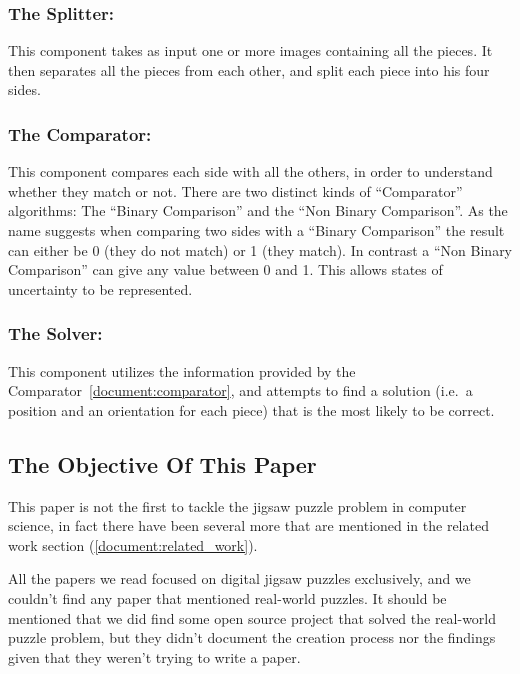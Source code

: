 \documentclass{article}
\newenvironment{indented_section}
  {\adjustwidth{3em}{0pt}}
  {\endadjustwidth}
\begin{document}
\begin{indented_section}

    \subsubsection{The Splitter:} This component takes as input one or more images
    containing all the pieces. It then separates all the pieces from each other,
    and split each piece into his four sides.\label{document:splitter}

    \subsubsection{The Comparator:} This component compares each side with all the
    others, in order to understand whether they match or not.\newline
    There are two distinct kinds of “Comparator” algorithms:
    The “Binary Comparison” and the “Non Binary Comparison”.
    As the name suggests when comparing two sides with a “Binary Comparison”
    the result can either be 0 (they do not match) or 1 (they match).
    In contrast a “Non Binary Comparison” can give any value between 0 and 1.
    This allows states of uncertainty to be represented.\label{document:comparator}

    \subsubsection{The Solver:} This component utilizes the information provided by the
    Comparator~\cref{document:comparator}, and attempts to find a solution
    (i.e.\ a position and an orientation for each piece)
    that is the most likely to be correct.\label{document:solver}

\end{indented_section}


\subsection{The Objective Of This Paper}\label{document:objective}

This paper is not the first to tackle the jigsaw puzzle problem in computer science,
in fact there have been several more that are mentioned in the related work section (\cref{document:related_work}).

All the papers we read focused on digital jigsaw puzzles exclusively,
and we couldn't find any paper that mentioned real-world puzzles.
It should be mentioned that we did find some open source project that solved the
real-world puzzle problem, but they didn’t document the creation process nor the
findings given that they weren't trying to write a paper.
\end{document}
